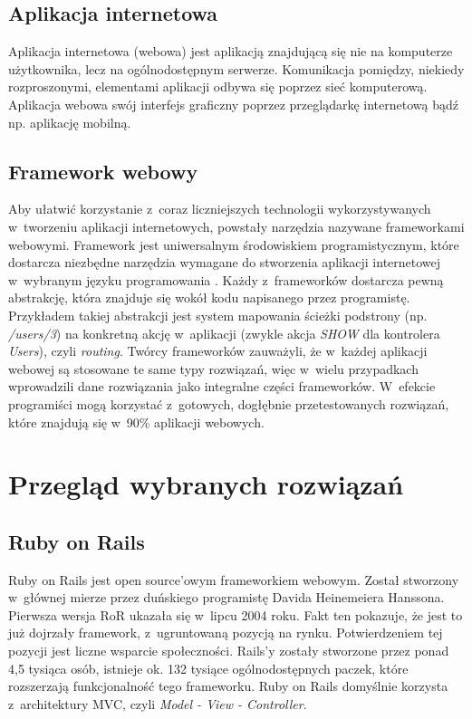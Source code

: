 \documentclass[mgr,oneside]{mgr}
\begin{document}
\section{Aplikacja internetowa}
Aplikacja internetowa (webowa) jest aplikacją znajdującą się nie na komputerze użytkownika, lecz na ogólnodostępnym serwerze. Komunikacja pomiędzy, niekiedy rozproszonymi, elementami aplikacji odbywa się poprzez sieć komputerową. Aplikacja webowa swój interfejs graficzny poprzez przeglądarkę internetową bądź np. aplikację mobilną.

\section{Framework webowy} %
Aby ułatwić korzystanie z~coraz liczniejszych technologii wykorzystywanych w~tworzeniu aplikacji internetowych, powstały narzędzia nazywane frameworkami webowymi. Framework jest uniwersalnym środowiskiem programistycznym, które dostarcza niezbędne narzędzia wymagane do stworzenia aplikacji internetowej w~wybranym języku programowania \cite{framework}. Każdy z~frameworków dostarcza pewną abstrakcję, która znajduje się wokół kodu napisanego przez programistę. Przykładem takiej abstrakcji jest system mapowania ścieżki podstrony (np. \textit{/users/3}) na konkretną akcję w~aplikacji (zwykle akcja \emph{SHOW} dla kontrolera \emph{Users}), czyli \emph{routing}. Twórcy frameworków zauważyli, że w~każdej aplikacji webowej są stosowane te same typy rozwiązań, więc w~wielu przypadkach wprowadzili dane rozwiązania jako integralne części frameworków. W~efekcie programiści mogą korzystać z~gotowych, dogłębnie przetestowanych rozwiązań, które znajdują się w~90\% aplikacji webowych.

\chapter{Przegląd wybranych rozwiązań}
\section{Ruby on Rails}
Ruby on Rails jest open source'owym frameworkiem webowym. Został stworzony w~głównej mierze przez duńskiego programistę Davida Heinemeiera Hanssona. Pierwsza wersja RoR ukazała się w~lipcu 2004 roku. Fakt ten pokazuje, że jest to już dojrzały framework, z~ugruntowaną pozycją na rynku. Potwierdzeniem tej pozycji jest liczne wsparcie społeczności. Rails'y zostały stworzone przez ponad 4,5 tysiąca osób, istnieje ok. 132 tysiące ogólnodostępnych paczek, które rozszerzają funkcjonalność tego frameworku. Ruby on Rails domyślnie korzysta z~architektury MVC, czyli \emph{Model - View - Controller}.
\end{document}
